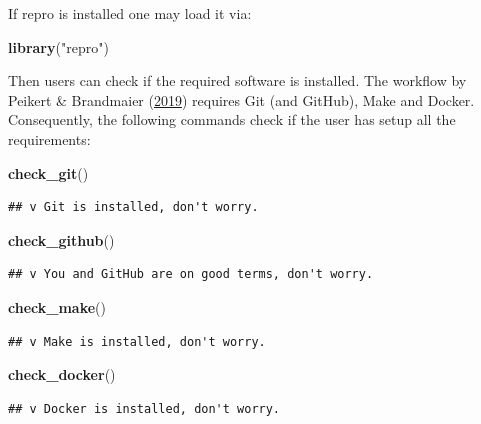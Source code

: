 \documentclass[12pt,a4paper,]{article}
\newenvironment{Shaded}{\begin{snugshade}}{\end{snugshade}}
\newcommand{\KeywordTok}[1]{\textcolor[rgb]{0.13,0.29,0.53}{\textbf{#1}}}
\newcommand{\NormalTok}[1]{#1}
\newcommand{\StringTok}[1]{\textcolor[rgb]{0.31,0.60,0.02}{#1}}
\begin{document}
If repro is installed one may load it via:

\begin{Shaded}
\begin{Highlighting}[]
\KeywordTok{library}\NormalTok{(}\StringTok{"repro"}\NormalTok{)}
\end{Highlighting}
\end{Shaded}

Then users can check if the required software is installed.
The workflow by Peikert \& Brandmaier (\protect\hyperlink{ref-peikertReproducibleDataAnalysis2019}{2019}) requires Git (and GitHub), Make and Docker.
Consequently, the following commands check if the user has setup all the requirements:

\begin{Shaded}
\begin{Highlighting}[]
\KeywordTok{check_git}\NormalTok{()}
\end{Highlighting}
\end{Shaded}

\begin{verbatim}
## v Git is installed, don't worry.
\end{verbatim}

\begin{Shaded}
\begin{Highlighting}[]
\KeywordTok{check_github}\NormalTok{()}
\end{Highlighting}
\end{Shaded}

\begin{verbatim}
## v You and GitHub are on good terms, don't worry.
\end{verbatim}

\begin{Shaded}
\begin{Highlighting}[]
\KeywordTok{check_make}\NormalTok{()}
\end{Highlighting}
\end{Shaded}

\begin{verbatim}
## v Make is installed, don't worry.
\end{verbatim}

\begin{Shaded}
\begin{Highlighting}[]
\KeywordTok{check_docker}\NormalTok{()}
\end{Highlighting}
\end{Shaded}

\begin{verbatim}
## v Docker is installed, don't worry.
\end{verbatim}
\end{document}
